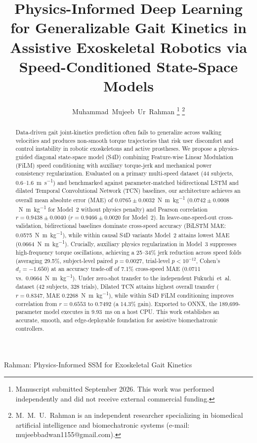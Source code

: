 \documentclass[journal]{IEEEtran}
\newcommand{\Nmskg}{\si{\newton\metre\per\kilogram}}
\begin{document}
\title{Physics-Informed Deep Learning for Generalizable Gait Kinetics in Assistive Exoskeletal Robotics via Speed-Conditioned State-Space Models}

\author{Muhammad~Mujeeb~Ur~Rahman%
\thanks{Manuscript submitted September 2026. This work was performed independently and did not receive external commercial funding.}%
\thanks{M.~M.~U.~Rahman is an independent researcher specializing in biomedical artificial intelligence and biomechatronic systems (e-mail: mujeebbadwan1155@gmail.com).}}

%
{Rahman: Physics-Informed SSM for Exoskeletal Gait Kinetics}

\maketitle
\IEEEpeerreviewmaketitle

\begin{abstract}
Data-driven gait joint-kinetics prediction often fails to generalize across walking velocities and produces non-smooth torque trajectories that risk user discomfort and control instability in robotic exoskeletons and active prostheses. We propose a physics-guided diagonal state-space model (S4D) combining Feature-wise Linear Modulation (FiLM) speed conditioning with auxiliary torque-jerk and mechanical power consistency regularization. Evaluated on a primary multi-speed dataset (44 subjects, 0.6--1.6~\si{\metre\per\second}) and benchmarked against parameter-matched bidirectional LSTM and dilated Temporal Convolutional Network (TCN) baselines, our architecture achieves an overall mean absolute error (MAE) of $0.0765 \pm 0.0032$~\Nmskg{} ($0.0742 \pm 0.0008$~\Nmskg{} for Model~2 without physics penalty) and Pearson correlation $r = 0.9438 \pm 0.0040$ ($r = 0.9466 \pm 0.0020$ for Model~2). In leave-one-speed-out cross-validation, bidirectional baselines dominate cross-speed accuracy (BiLSTM MAE: 0.0575~\Nmskg{}), while within causal S4D variants Model~2 attains lowest MAE (0.0664~\Nmskg{}). Crucially, auxiliary physics regularization in Model~3 suppresses high-frequency torque oscillations, achieving a 25--34\% jerk reduction across speed folds (averaging 29.5\%, subject-level paired $p = 0.0027$, trial-level $p < 10^{-12}$, Cohen's $d_z = -1.650$) at an accuracy trade-off of 7.1\% cross-speed MAE (0.0711 vs.\ 0.0664~\Nmskg{}). Under zero-shot transfer to the independent Fukuchi~et~al. dataset (42 subjects, 328 trials), Dilated TCN attains highest overall transfer ($r = 0.8347$, MAE 0.2268~\Nmskg{}), while within S4D FiLM conditioning improves correlation from $r = 0.6553$ to $0.7492$ (a 14.3\% gain). Exported to ONNX, the 189,699-parameter model executes in 9.93~\si{\milli\second} on a host CPU. This work establishes an accurate, smooth, and edge-deployable foundation for assistive biomechatronic controllers.
\end{abstract}
\end{document}

